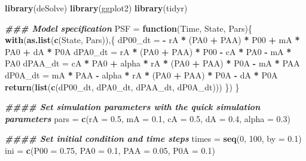 \documentclass[
]{book}
\newenvironment{Shaded}{\begin{snugshade}}{\end{snugshade}}
\newcommand{\AttributeTok}[1]{\textcolor[rgb]{0.13,0.29,0.53}{#1}}
\newcommand{\ControlFlowTok}[1]{\textcolor[rgb]{0.13,0.29,0.53}{\textbf{#1}}}
\newcommand{\DecValTok}[1]{\textcolor[rgb]{0.00,0.00,0.81}{#1}}
\newcommand{\DocumentationTok}[1]{\textcolor[rgb]{0.56,0.35,0.01}{\textbf{\textit{#1}}}}
\newcommand{\FloatTok}[1]{\textcolor[rgb]{0.00,0.00,0.81}{#1}}
\newcommand{\FunctionTok}[1]{\textcolor[rgb]{0.13,0.29,0.53}{\textbf{#1}}}
\newcommand{\NormalTok}[1]{#1}
\newcommand{\OtherTok}[1]{\textcolor[rgb]{0.56,0.35,0.01}{#1}}
\newcommand{\SpecialCharTok}[1]{\textcolor[rgb]{0.81,0.36,0.00}{\textbf{#1}}}
\begin{document}
\begin{Shaded}
\begin{Highlighting}[]
\FunctionTok{library}\NormalTok{(deSolve)}
\FunctionTok{library}\NormalTok{(ggplot2)}
\FunctionTok{library}\NormalTok{(tidyr)}


\DocumentationTok{\#\#\# Model specification}
\NormalTok{PSF }\OtherTok{=} \ControlFlowTok{function}\NormalTok{(Time, State, Pars)\{}
  \FunctionTok{with}\NormalTok{(}\FunctionTok{as.list}\NormalTok{(}\FunctionTok{c}\NormalTok{(State, Pars)),\{}
\NormalTok{    dP00\_dt }\OtherTok{=} \SpecialCharTok{{-}}\NormalTok{ rA }\SpecialCharTok{*}\NormalTok{ (PA0 }\SpecialCharTok{+}\NormalTok{ PAA) }\SpecialCharTok{*}\NormalTok{ P00 }\SpecialCharTok{+}\NormalTok{ mA }\SpecialCharTok{*}\NormalTok{ PA0 }\SpecialCharTok{+}\NormalTok{ dA }\SpecialCharTok{*}\NormalTok{ P0A }
\NormalTok{    dPA0\_dt }\OtherTok{=}\NormalTok{ rA }\SpecialCharTok{*}\NormalTok{ (PA0 }\SpecialCharTok{+}\NormalTok{ PAA) }\SpecialCharTok{*}\NormalTok{ P00 }\SpecialCharTok{{-}}\NormalTok{ cA }\SpecialCharTok{*}\NormalTok{ PA0 }\SpecialCharTok{{-}}\NormalTok{ mA }\SpecialCharTok{*}\NormalTok{ PA0}
\NormalTok{    dPAA\_dt }\OtherTok{=}\NormalTok{ cA }\SpecialCharTok{*}\NormalTok{ PA0 }\SpecialCharTok{+}\NormalTok{ alpha }\SpecialCharTok{*}\NormalTok{ rA }\SpecialCharTok{*}\NormalTok{ (PA0 }\SpecialCharTok{+}\NormalTok{ PAA) }\SpecialCharTok{*}\NormalTok{ P0A }\SpecialCharTok{{-}}\NormalTok{ mA }\SpecialCharTok{*}\NormalTok{ PAA}
\NormalTok{    dP0A\_dt }\OtherTok{=}\NormalTok{ mA }\SpecialCharTok{*}\NormalTok{ PAA }\SpecialCharTok{{-}}\NormalTok{ alpha }\SpecialCharTok{*}\NormalTok{ rA }\SpecialCharTok{*}\NormalTok{ (PA0 }\SpecialCharTok{+}\NormalTok{ PAA) }\SpecialCharTok{*}\NormalTok{ P0A }\SpecialCharTok{{-}}\NormalTok{ dA }\SpecialCharTok{*}\NormalTok{ P0A}
    \FunctionTok{return}\NormalTok{(}\FunctionTok{list}\NormalTok{(}\FunctionTok{c}\NormalTok{(dP00\_dt, dPA0\_dt, dPAA\_dt, dP0A\_dt)))}
\NormalTok{  \})}
\NormalTok{\}}


\DocumentationTok{\#\#\#\# Set simulation parameters with the \textquotesingle{}quick simulation parameters\textquotesingle{}}
\NormalTok{pars }\OtherTok{=} \FunctionTok{c}\NormalTok{(}\AttributeTok{rA =} \FloatTok{0.5}\NormalTok{,}
         \AttributeTok{mA =} \FloatTok{0.1}\NormalTok{,}
         \AttributeTok{cA =} \FloatTok{0.5}\NormalTok{,}
         \AttributeTok{dA =} \FloatTok{0.4}\NormalTok{,}
         \AttributeTok{alpha =} \FloatTok{0.3}\NormalTok{)}


\DocumentationTok{\#\#\#\# Set initial condition and time steps}
\NormalTok{times }\OtherTok{=} \FunctionTok{seq}\NormalTok{(}\DecValTok{0}\NormalTok{, }\DecValTok{100}\NormalTok{, }\AttributeTok{by =} \FloatTok{0.1}\NormalTok{)}
\NormalTok{ini }\OtherTok{=} \FunctionTok{c}\NormalTok{(}\AttributeTok{P00 =} \FloatTok{0.75}\NormalTok{, }\AttributeTok{PA0 =} \FloatTok{0.1}\NormalTok{, }\AttributeTok{PAA =} \FloatTok{0.05}\NormalTok{, }\AttributeTok{P0A =} \FloatTok{0.1}\NormalTok{)}



\end{Highlighting}
\end{Shaded}
\end{document}
